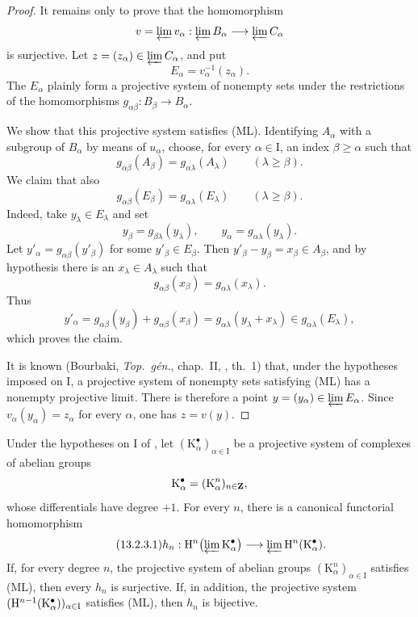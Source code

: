 \begin{proof}
It remains only to prove that the homomorphism
\[
  v=\varprojlim v_\alpha:
  \varprojlim B_\alpha\longrightarrow\varprojlim C_\alpha
\]
is surjective.
Let $z=(z_\alpha)\in\varprojlim C_\alpha$, and put
\[
  E_\alpha=v_\alpha^{-1}(z_\alpha).
\]
The $E_\alpha$ plainly form a projective system of nonempty sets under
the restrictions of the homomorphisms
$g_{\alpha\beta}:B_\beta\longrightarrow B_\alpha$.

We show that this projective system satisfies (ML).
Identifying $A_\alpha$ with a subgroup of $B_\alpha$ by means of
$u_\alpha$, choose, for every $\alpha\in\mathrm{I}$, an index
$\beta\geq\alpha$ such that
\[
  g_{\alpha\beta}(A_\beta)
  =
  g_{\alpha\lambda}(A_\lambda)
  \qquad(\lambda\geq\beta).
\]
We claim that also
\[
  g_{\alpha\beta}(E_\beta)
  =
  g_{\alpha\lambda}(E_\lambda)
  \qquad(\lambda\geq\beta).
\]
Indeed, take $y_\lambda\in E_\lambda$ and set
\[
  y_\beta=g_{\beta\lambda}(y_\lambda),
  \qquad
  y_\alpha=g_{\alpha\lambda}(y_\lambda).
\]
Let $y'_\alpha=g_{\alpha\beta}(y'_\beta)$ for some
$y'_\beta\in E_\beta$.
Then $y'_\beta-y_\beta=x_\beta\in A_\beta$, and by hypothesis there
is an $x_\lambda\in A_\lambda$ such that
\[
  g_{\alpha\beta}(x_\beta)
  =
  g_{\alpha\lambda}(x_\lambda).
\]
Thus
\[
  y'_\alpha
  =
  g_{\alpha\beta}(y_\beta)+g_{\alpha\beta}(x_\beta)
  =
  g_{\alpha\lambda}(y_\lambda+x_\lambda)
  \in g_{\alpha\lambda}(E_\lambda),
\]
which proves the claim.

It is known (Bourbaki, \emph{Top.\ g\'{e}n.}, chap.~II,
, th.~1) that, under the hypotheses imposed on
$\mathrm{I}$, a projective system of nonempty sets satisfying (ML)
has a nonempty projective limit.
There is therefore a point
$y=(y_\alpha)\in\varprojlim E_\alpha$.
Since $v_\alpha(y_\alpha)=z_\alpha$ for every $\alpha$, one has
$z=v(y)$.
\end{proof}

\begin{proposition}[13.2.3]
\label{0.13.2.3}
Under the hypotheses on $\mathrm{I}$ of , let
$(\mathrm{K}^\bullet_\alpha)_{\alpha\in\mathrm{I}}$ be a projective
system of complexes of abelian groups
\[
  \mathrm{K}^\bullet_\alpha
  =
  (\mathrm{K}^n_\alpha)_{n\in\mathbf{Z}},
\]
whose differentials have degree $+1$.
For every $n$, there is a canonical functorial homomorphism
\begin{equation}
\label{0.13.2.3.1}
\tag{13.2.3.1}
  h_n:
  \mathrm{H}^n\bigl(\varprojlim\mathrm{K}^\bullet_\alpha\bigr)
  \longrightarrow
  \varprojlim\mathrm{H}^n(\mathrm{K}^\bullet_\alpha).
\end{equation}
If, for every degree $n$, the projective system of abelian groups
$(\mathrm{K}^n_\alpha)_{\alpha\in\mathrm{I}}$ satisfies {\rm(ML)},
then every $h_n$ is surjective.
If, in addition, the projective system
$(\mathrm{H}^{n-1}(\mathrm{K}^\bullet_\alpha))_{\alpha\in\mathrm{I}}$
satisfies {\rm(ML)}, then $h_n$ is bijective.
\end{proposition}

